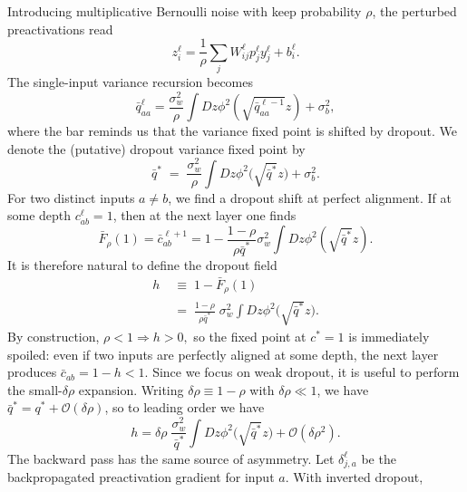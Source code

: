 \documentclass{article}
\theoremstyle{plain}
\theoremstyle{definition}
\theoremstyle{remark}
\begin{document}
Introducing multiplicative Bernoulli noise with keep probability $\rho$, the perturbed preactivations read
\relax
\begin{equation}
z_i^\ell = \frac{1}{\rho} \sum_j W_{ij}^\ell p_j^\ell y_j^\ell + b_i^\ell.
\end{equation}
\relax
The single-input variance recursion becomes
\relax
\begin{equation}
\bar{q}_{aa}^{\ell} = \frac{\sigma_{w}^{2}}{\rho} \int Dz \phi^{2}\left( \sqrt{\bar{q}_{aa}^{\ell-1}} z \right) + \sigma_{b}^{2},
\end{equation}
\relax
where the bar reminds us that the variance fixed point is shifted by dropout. We denote the (putative) dropout variance fixed point by
\relax
\begin{equation}
\bar q^{*} \;=\; \frac{\sigma_w^2}{\rho}\int Dz \phi^2\big(\sqrt{\bar q^{*}} z\big) + \sigma_b^2.
\label{eq:qstar-dropout}
\end{equation}
\relax
For two distinct inputs $a\neq b$, we find a dropout shift at perfect alignment. If at some depth $c^{\ell}_{ab}=1$, then at the next layer one finds \cite{schoenholz2017deepinformationpropagation}
\relax
\begin{equation}
\bar F_\rho(1)= \bar c^{\ell+1}_{ab} = 1 - \frac{1 - \rho}{\rho \bar{q}^{*}} \sigma_{w}^{2} \int Dz \phi^{2}\left( \sqrt{\bar{q}^{*}} z \right).
\end{equation}
\relax
It is therefore natural to define the dropout field
\relax
\begin{align}
h &\;\equiv\; 1-\bar F_\rho(1)\nonumber\\
&\;=\; \frac{1-\rho}{\rho \bar q^{*}}\; \sigma_w^2\int Dz \phi^2\big(\sqrt{\bar q^{*}} z\big).
\label{eq:Delta_exact}
\end{align}
\relax
By construction, $
\rho<1
\Rightarrow
h>0,$
so the fixed point at $c^*=1$ is immediately spoiled: even if two inputs are perfectly aligned at some depth, the next layer produces $\bar c_{ab}=1-h<1$. Since we focus on weak dropout, it is useful to perform the small-\(\delta\rho\) expansion. Writing $\delta\rho\equiv 1-\rho$ with $\delta\rho\ll 1$, we have
$\bar q^*=q^*+\mathcal O(\delta\rho)$, so to leading order we have
\relax
\begin{equation}
h = \delta\rho\; \frac{\sigma_w^2}{\bar q^{*}}\int Dz \phi^2\big(\sqrt{\bar q^{*}} z\big) + \mathcal O(\delta\rho^2).
\label{eq:Delta_weakdrop}
\end{equation}
\relax
The backward pass has the same source of asymmetry. Let \(\delta^\ell_{j,a}\) be the backpropagated preactivation gradient for input \(a\). With inverted dropout,
\end{document}
